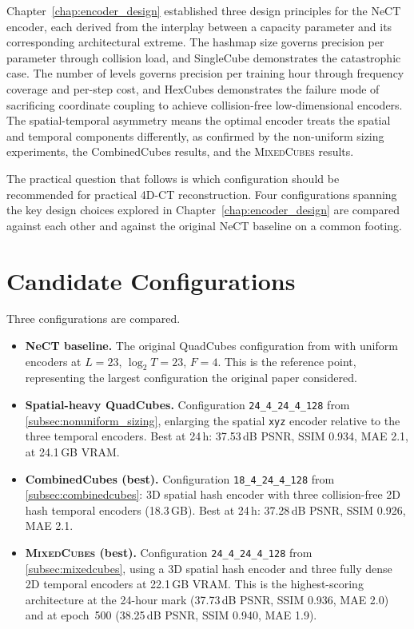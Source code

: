 \documentclass[12pt, a4paper, twoside]{report}
\newcommand{\MixedCubes}{\textsc{MixedCubes}}
\begin{document}
Chapter~\ref{chap:encoder_design} established three design principles for the NeCT encoder, each derived from the interplay between a capacity parameter and its corresponding architectural extreme. The hashmap size governs precision per parameter through collision load, and SingleCube demonstrates the catastrophic case. The number of levels governs precision per training hour through frequency coverage and per-step cost, and HexCubes demonstrates the failure mode of sacrificing coordinate coupling to achieve collision-free low-dimensional encoders. The spatial-temporal asymmetry means the optimal encoder treats the spatial and temporal components differently, as confirmed by the non-uniform sizing experiments, the CombinedCubes results, and the \MixedCubes{} results.

The practical question that follows is which configuration should be recommended for practical 4D-CT reconstruction. Four configurations spanning the key design choices explored in Chapter~\ref{chap:encoder_design} are compared against each other and against the original NeCT baseline on a common footing.

\section{Candidate Configurations}
\label{sec:comp_candidates}

Three configurations are compared.

\begin{itemize}
    \item \textbf{NeCT baseline.} The original QuadCubes configuration from \citet{friis2025nect} with uniform encoders at $L = 23$, $\log_2 T = 23$, $F = 4$. This is the reference point, representing the largest configuration the original paper considered.
    \item \textbf{Spatial-heavy QuadCubes.} Configuration \texttt{24\_4\_24\_4\_128} from \cref{subsec:nonuniform_sizing}, enlarging the spatial \texttt{xyz} encoder relative to the three temporal encoders. Best at 24\,h: 37.53\,dB PSNR, SSIM 0.934, MAE 2.1, at 24.1\,GB VRAM.
    \item \textbf{CombinedCubes (best).} Configuration \texttt{18\_4\_24\_4\_128} from \cref{subsec:combinedcubes}: 3D spatial hash encoder with three collision-free 2D hash temporal encoders (18.3\,GB). Best at 24\,h: 37.28\,dB PSNR, SSIM 0.926, MAE 2.1.
    \item \textbf{\MixedCubes{} (best).} Configuration \texttt{24\_4\_24\_4\_128} from \cref{subsec:mixedcubes}, using a 3D spatial hash encoder and three fully dense 2D temporal encoders at 22.1\,GB VRAM. This is the highest-scoring architecture at the 24-hour mark (37.73\,dB PSNR, SSIM 0.936, MAE 2.0) and at epoch~500 (38.25\,dB PSNR, SSIM 0.940, MAE 1.9).
\end{itemize}
\end{document}
